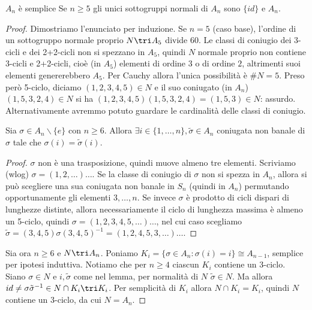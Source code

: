 \begin{proposition}{$A_n$ è semplice}
    Se $n \ge 5$ gli unici sottogruppi normali di $A_n$ sono $\{id\}$ e $A_n$.
\end{proposition}
\begin{proof}
    Dimostriamo l'enunciato per induzione. Se $n = 5$ (caso base), l'ordine di un sottogruppo normale proprio $N \tri A_5$ divide $60$. Le classi di coniugio dei 3-cicli e dei 2+2-cicli non si spezzano in $A_5$, quindi $N$ normale proprio non contiene 3-cicli e 2+2-cicli, cioè (in $A_5$) elementi di ordine $3$ o di ordine $2$, altrimenti suoi elementi genererebbero $A_5$. Per Cauchy allora l'unica possibilità è $\#N = 5$. Preso però 5-ciclo, diciamo $(1, 2, 3, 4, 5) \in N$ e il suo coniugato (in $A_n$) $(1, 5, 3, 2, 4) \in N$ si ha $(1, 2, 3, 4, 5)(1, 5, 3, 2, 4) = (1, 5, 3) \in N$: assurdo. Alternativamente avremmo potuto guardare le cardinalità delle classi di coniugio.

    \begin{lemma2}
        Sia $\sigma \in A_n\backslash\{e\}$ con $n \ge 6$. Allora $\exists i \in \{1, \dots, n\}, \tilde \sigma \in A_n$ coniugata non banale di $\sigma$ tale che $\sigma(i) = \tilde \sigma(i)$.
    \end{lemma2}
    \begin{proof}
        $\sigma$ non è una trasposizione, quindi muove almeno tre elementi. Scriviamo (wlog) $\sigma = (1, 2, \dots)\dots$. Se la classe di coniugio di $\sigma$ non si spezza in $A_n$, allora si può scegliere una sua coniugata non banale in $S_n$ (quindi in $A_n$) permutando opportunamente gli elementi $3, \dots, n$. Se invece $\sigma$ è prodotto di cicli dispari di lunghezze distinte, allora necessariamente il ciclo di lunghezza massima è almeno un 5-ciclo, quindi $\sigma = (1, 2, 3, 4, 5, \dots)\dots$, nel cui caso scegliamo $\tilde \sigma = (3, 4, 5) \sigma (3, 4, 5)^{-1} = (1, 2, 4, 5, 3, \dots)\dots$.
    \end{proof}
    Sia ora $n \ge 6$ e $N \tri A_n$. Poniamo $K_i = \{\sigma \in A_n : \sigma(i) = i\} \cong A_{n - 1}$, semplice per ipotesi induttiva. Notiamo che per $n \ge 4$ ciascun $K_i$ contiene un 3-ciclo. Siano $\sigma \in N$ e $i, \tilde \sigma$ come nel lemma, per normalità di $N$ $\tilde \sigma \in N$. Ma allora $id \neq \sigma {\tilde \sigma}^{-1} \in N \cap K_i \tri K_i$. Per semplicità di $K_i$ allora $N \cap K_i = K_i$, quindi $N$ contiene un 3-ciclo, da cui $N = A_n$.
\end{proof}
    

